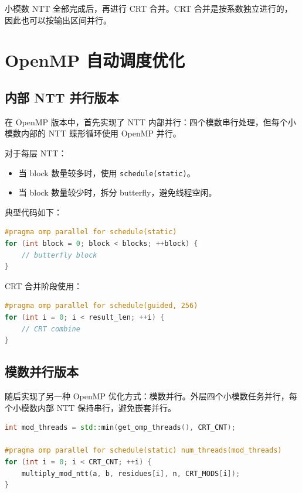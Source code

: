 \documentclass[UTF8,a4paper,12pt]{ctexart}
\begin{document}
小模数 NTT 全部完成后，再进行 CRT 合并。CRT 合并是按系数独立进行的，因此也可以按输出区间并行。

\section{OpenMP 自动调度优化}

\subsection{内部 NTT 并行版本}

在 OpenMP 版本中，首先实现了 NTT 内部并行：四个模数串行处理，但每个小模数内部的 NTT 蝶形循环使用 OpenMP 并行。

对于每层 NTT：

\begin{itemize}
    \item 当 block 数量较多时，使用 \texttt{schedule(static)}。
    \item 当 block 数量较少时，拆分 butterfly，避免线程空闲。
\end{itemize}

典型代码如下：

\begin{lstlisting}[language=C++]
#pragma omp parallel for schedule(static)
for (int block = 0; block < blocks; ++block) {
    // butterfly block
}
\end{lstlisting}

CRT 合并阶段使用：

\begin{lstlisting}[language=C++]
#pragma omp parallel for schedule(guided, 256)
for (int i = 0; i < result_len; ++i) {
    // CRT combine
}
\end{lstlisting}

\subsection{模数并行版本}

随后实现了另一种 OpenMP 优化方式：模数并行。外层四个小模数任务并行，每个小模数内部 NTT 保持串行，避免嵌套并行。

\begin{lstlisting}[language=C++]
int mod_threads = std::min(get_omp_threads(), CRT_CNT);

#pragma omp parallel for schedule(static) num_threads(mod_threads)
for (int i = 0; i < CRT_CNT; ++i) {
    multiply_mod_ntt(a, b, residues[i], n, CRT_MODS[i]);
}
\end{lstlisting}
\end{document}
